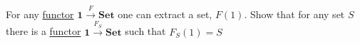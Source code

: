 For any \hyperref[D3.35]{functor} $\mathbf{1} \xrightarrow{F} \mathbf{Set}$ one can extract a set, $F(1)$. Show that for any set $S$ there is a \hyperref[D3.35]{functor} $\mathbf{1}\xrightarrow{F_S}\mathbf{Set}$ such that $F_S(1)=S$